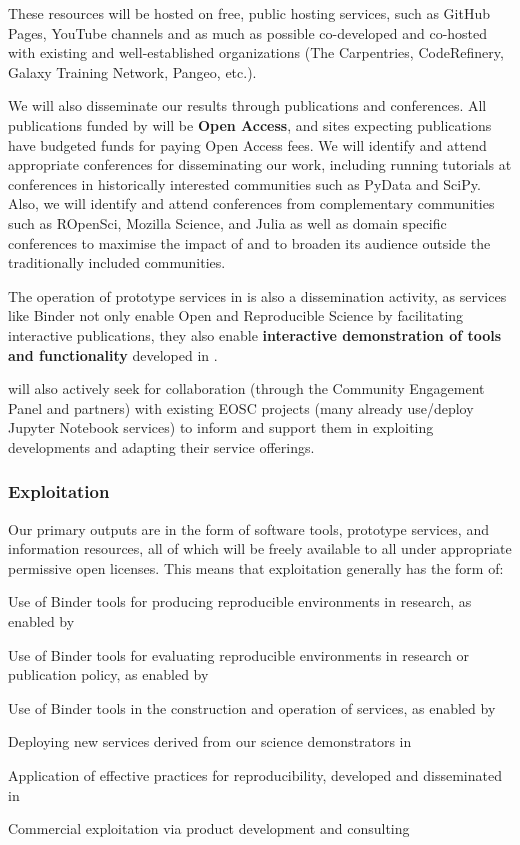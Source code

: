 These resources will be hosted on free, public hosting services,
such as GitHub Pages, YouTube channels and as much as possible co-developed and co-hosted with existing and
well-established organizations
(The Carpentries, CodeRefinery, Galaxy Training Network, Pangeo, etc.).

We will also disseminate our results through publications and conferences.
All publications funded by \TheProject will be \textbf{Open Access},
and sites expecting publications have budgeted funds for paying Open Access fees.
We will identify and attend appropriate conferences for disseminating our work,
including running tutorials at conferences in historically interested communities such as PyData and SciPy.
Also, we will identify and attend conferences from complementary communities such as ROpenSci,
Mozilla Science, and Julia
as well as domain specific conferences to maximise the impact of \TheProject and to broaden its
audience outside the
traditionally included communities.

The operation of prototype services in  is also a dissemination activity,
as services like Binder not only enable Open and Reproducible Science by facilitating interactive publications,
they also enable \textbf{interactive demonstration of tools and functionality}
developed in \TheProject.

\TheProject will also actively seek for collaboration (through the Community
Engagement Panel and
\TheProject partners) with existing EOSC projects (many already use/deploy
Jupyter Notebook services) to inform and support them in exploiting \TheProject
developments and adapting their service offerings.
\subsubsection{Exploitation}

Our primary outputs are in the form of software tools, prototype services, and information resources,
all of which will be freely available to all under appropriate permissive open licenses.
This means that exploitation generally has the form of:

\begin{compactenum}
  \item Use of Binder tools for producing reproducible environments in research, as enabled by 
  \item Use of Binder tools for evaluating reproducible environments in research or publication policy, as enabled by 
  \item Use of Binder tools in the construction and operation of services, as enabled by 
  \item Deploying new services derived from our science demonstrators in 
  \item Application of effective practices for reproducibility, developed and disseminated in 
  \item Commercial exploitation via product development and consulting 
\end{compactenum}

